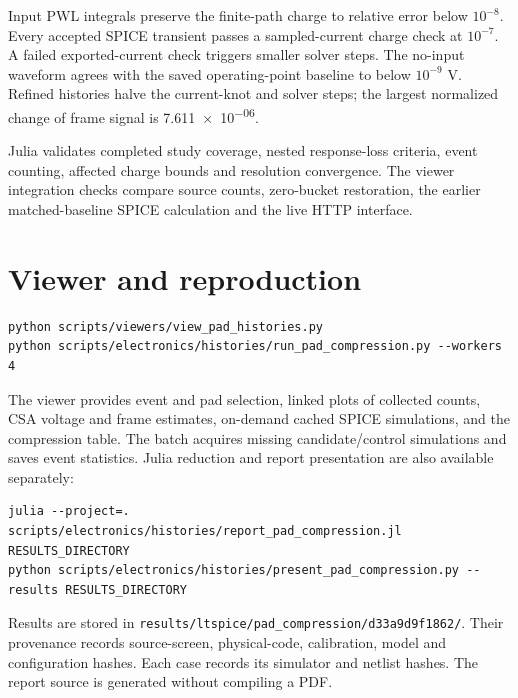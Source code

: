 \documentclass[11pt,a4paper]{article}
\begin{document}
Input PWL integrals preserve the finite-path charge to relative error below
$10^{-8}$. Every accepted SPICE transient passes a sampled-current charge check
at $10^{-7}$. A failed exported-current check triggers smaller solver steps.
The no-input waveform agrees with the saved operating-point baseline to below
$10^{-9}$ V. Refined histories halve the current-knot and solver steps; the
largest normalized change of frame signal is \num{7.611e-06}.

Julia validates completed study coverage, nested response-loss criteria, event
counting, affected charge bounds and resolution convergence. The viewer
integration checks compare source counts, zero-bucket restoration, the earlier
matched-baseline SPICE calculation and the live HTTP interface.

\section{Viewer and reproduction}
\begin{verbatim}
python scripts/viewers/view_pad_histories.py
python scripts/electronics/histories/run_pad_compression.py --workers 4
\end{verbatim}
The viewer provides event and pad selection, linked plots of collected counts,
CSA voltage and frame estimates, on-demand cached SPICE simulations, and the
compression table. The batch acquires missing candidate/control simulations and
saves event statistics. Julia reduction and report presentation are also
available separately:
\begin{verbatim}
julia --project=. scripts/electronics/histories/report_pad_compression.jl RESULTS_DIRECTORY
python scripts/electronics/histories/present_pad_compression.py --results RESULTS_DIRECTORY
\end{verbatim}
Results are stored in \texttt{results/ltspice/pad\_compression/d33a9d9f1862/}.
Their provenance records source-screen, physical-code, calibration, model and
configuration hashes. Each case records its simulator and netlist hashes.
The report source is generated without compiling a PDF.
\end{document}

